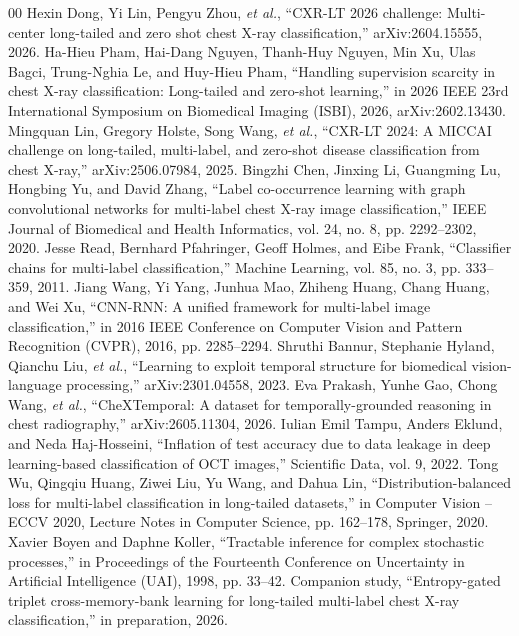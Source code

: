 \documentclass[conference]{IEEEtran}
\begin{document}
\begin{thebibliography}{00}
 Hexin Dong, Yi Lin, Pengyu Zhou, \textit{et al.}, ``CXR-LT 2026 challenge: Multi-center long-tailed and zero shot chest X-ray classification,'' arXiv:2604.15555, 2026.
 Ha-Hieu Pham, Hai-Dang Nguyen, Thanh-Huy Nguyen, Min Xu, Ulas Bagci, Trung-Nghia Le, and Huy-Hieu Pham, ``Handling supervision scarcity in chest X-ray classification: Long-tailed and zero-shot learning,'' in 2026 IEEE 23rd International Symposium on Biomedical Imaging (ISBI), 2026, arXiv:2602.13430.
 Mingquan Lin, Gregory Holste, Song Wang, \textit{et al.}, ``CXR-LT 2024: A MICCAI challenge on long-tailed, multi-label, and zero-shot disease classification from chest X-ray,'' arXiv:2506.07984, 2025.
 Bingzhi Chen, Jinxing Li, Guangming Lu, Hongbing Yu, and David Zhang, ``Label co-occurrence learning with graph convolutional networks for multi-label chest X-ray image classification,'' IEEE Journal of Biomedical and Health Informatics, vol. 24, no. 8, pp. 2292--2302, 2020.
 Jesse Read, Bernhard Pfahringer, Geoff Holmes, and Eibe Frank, ``Classifier chains for multi-label classification,'' Machine Learning, vol. 85, no. 3, pp. 333--359, 2011.
 Jiang Wang, Yi Yang, Junhua Mao, Zhiheng Huang, Chang Huang, and Wei Xu, ``CNN-RNN: A unified framework for multi-label image classification,'' in 2016 IEEE Conference on Computer Vision and Pattern Recognition (CVPR), 2016, pp. 2285--2294.
 Shruthi Bannur, Stephanie Hyland, Qianchu Liu, \textit{et al.}, ``Learning to exploit temporal structure for biomedical vision-language processing,'' arXiv:2301.04558, 2023.
 Eva Prakash, Yunhe Gao, Chong Wang, \textit{et al.}, ``CheXTemporal: A dataset for temporally-grounded reasoning in chest radiography,'' arXiv:2605.11304, 2026.
 Iulian Emil Tampu, Anders Eklund, and Neda Haj-Hosseini, ``Inflation of test accuracy due to data leakage in deep learning-based classification of OCT images,'' Scientific Data, vol. 9, 2022.
 Tong Wu, Qingqiu Huang, Ziwei Liu, Yu Wang, and Dahua Lin, ``Distribution-balanced loss for multi-label classification in long-tailed datasets,'' in Computer Vision -- ECCV 2020, Lecture Notes in Computer Science, pp. 162--178, Springer, 2020.
 Xavier Boyen and Daphne Koller, ``Tractable inference for complex stochastic processes,'' in Proceedings of the Fourteenth Conference on Uncertainty in Artificial Intelligence (UAI), 1998, pp. 33--42.
 Companion study, ``Entropy-gated triplet cross-memory-bank learning for long-tailed multi-label chest X-ray classification,'' in preparation, 2026.
\end{thebibliography}
\end{document}
